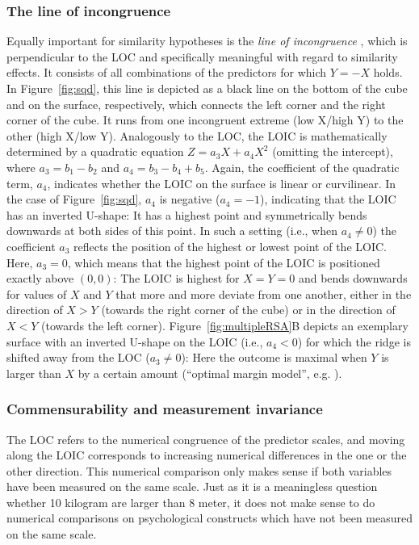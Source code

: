 \documentclass[jou,a4paper,draftfirst]{apa6}
\begin{document}
\subsubsection{The line of incongruence}
Equally important for similarity hypotheses is the \emph{line of incongruence} \parencite[LOIC,][]{edwards_relationship_2007}, which is perpendicular to the LOC and specifically meaningful with regard to similarity effects. It consists of all combinations of the predictors for which $Y = -X$ holds. In Figure~\ref{fig:sqd}, this line is depicted as a black line on the bottom of the cube and on the surface, respectively, which connects the left corner and the right corner of the cube. It runs from one incongruent extreme (low X/high Y) to the other (high X/low Y).
Analogously to the LOC, the LOIC is mathematically determined by a quadratic equation $Z = a_3X + a_4X^2$ (omitting the intercept), where $a_3 = b_1 - b_2$ and $a_4 = b_3 - b_4 + b_5$. Again, the coefficient of the quadratic term, $a_4$, indicates whether the LOIC on the surface is linear or curvilinear. In the case of Figure~\ref{fig:sqd}, $a_4$ is negative ($a_4 = -1$), indicating that the LOIC has an inverted U-shape: It has a highest point and symmetrically bends downwards at both sides of this point. In such a setting (i.e., when $a_4 \neq 0$) the coefficient $a_3$ reflects the position of the highest or lowest point of the LOIC. Here, $a_3 = 0$, which means that the highest point of the LOIC is positioned exactly above $(0,0)$: The LOIC is highest for $X = Y = 0$ and bends downwards for values of $X$ and $Y$ that more and more deviate from one another, either in the direction of $X > Y$ (towards the right corner of the cube) or in the direction of $X < Y$ (towards the left corner). Figure~\ref{fig:multipleRSA}B depicts an exemplary surface with an inverted U-shape on the LOIC (i.e., $a_4 < 0$) for which the ridge is shifted away from the LOC ($a_3 \neq 0$): Here the outcome is maximal when $Y$ is larger than $X$ by a certain amount (``optimal margin model'', e.g. ).

\begin{figure*}[ht!]
\centering
{}
\caption{Multiple examples of RSA configurations. Figure available at \url{https://osf.io/ftsrd/}, under a CC-BY4.0 license.}
\label{fig:multipleRSA}
\end{figure*}

\subsubsection{Commensurability and measurement invariance}
The LOC refers to the numerical congruence of the predictor scales, and moving along the LOIC corresponds to increasing numerical differences in the one or the other direction. This numerical comparison only makes sense if both variables have been measured on the same scale. Just as it is a meaningless question whether 10 kilogram are larger than 8 meter, it does not make sense to do numerical comparisons on psychological constructs which have not been measured on the same scale. 
\end{document}

